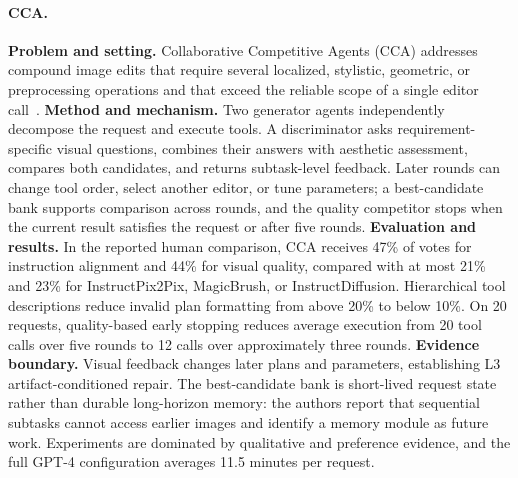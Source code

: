 \paragraph{CCA.}
\textbf{Problem and setting.} Collaborative Competitive Agents (CCA) addresses compound image edits that require several localized, stylistic, geometric, or preprocessing operations and that exceed the reliable scope of a single editor call~\cite{hang2024cca}. \textbf{Method and mechanism.} Two generator agents independently decompose the request and execute tools. A discriminator asks requirement-specific visual questions, combines their answers with aesthetic assessment, compares both candidates, and returns subtask-level feedback. Later rounds can change tool order, select another editor, or tune parameters; a best-candidate bank supports comparison across rounds, and the quality competitor stops when the current result satisfies the request or after five rounds. \textbf{Evaluation and results.} In the reported human comparison, CCA receives 47\% of votes for instruction alignment and 44\% for visual quality, compared with at most 21\% and 23\% for InstructPix2Pix, MagicBrush, or InstructDiffusion. Hierarchical tool descriptions reduce invalid plan formatting from above 20\% to below 10\%. On 20 requests, quality-based early stopping reduces average execution from 20 tool calls over five rounds to 12 calls over approximately three rounds. \textbf{Evidence boundary.} Visual feedback changes later plans and parameters, establishing L3 artifact-conditioned repair. The best-candidate bank is short-lived request state rather than durable long-horizon memory: the authors report that sequential subtasks cannot access earlier images and identify a memory module as future work. Experiments are dominated by qualitative and preference evidence, and the full GPT-4 configuration averages 11.5 minutes per request.

